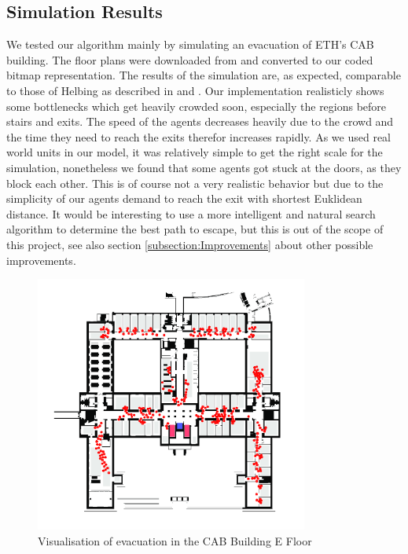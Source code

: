 \documentclass[11pt]{article}
\begin{document}
\subsection{Simulation Results}

We tested our algorithm mainly by simulating an evacuation of ETH's CAB building.
The floor plans were downloaded from \cite{ethfloors} and converted to our coded bitmap representation.
The results of the simulation are, as expected, comparable to those of Helbing as described in \cite{SFMPD} and \cite{SDFEP}.
Our implementation realisticly shows some bottlenecks which get heavily crowded soon, especially the regions before stairs and exits.
The speed of the agents decreases heavily due to the crowd and the time they need to reach the exits therefor increases rapidly.
As we used real world units in our model, it was relatively simple to get the right scale for the simulation,
nonetheless we found that some agents got stuck at the doors, as they block each other.
This is of course not a very realistic behavior but due to the simplicity of our agents demand to reach the
exit with shortest Euklidean distance. It would be interesting to use a more intelligent and natural search 
algorithm to determine the best path to escape, but this is out of the scope of this project, 
see also section \ref{subsection:Improvements} about other possible improvements.

\begin{figure}[ht]
\centering
\includegraphics[width=0.8\textwidth]{./images/cab1.png}
\caption{Visualisation of evacuation in the CAB Building E Floor} 
\label{cab1}
\end{figure}
\end{document}

